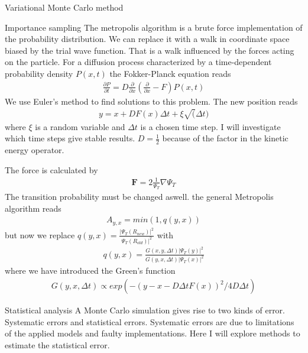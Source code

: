 \documentclass[a4paper, 12pt, titlepage]{article}
\begin{document}
\begin{section}{Variational Monte Carlo method}
 \begin{subsection}{Importance sampling}
 	The metropolis algorithm is a brute force implementation of the probability distribution. We can replace it with a walk in coordinate space biased by the trial wave function. That is a walk influenced by the forces acting on the particle. 
 	For a diffusion process characterized by a time-dependent probability density $P(x,t)$ the Fokker-Planck equation reads
 	\begin{align}
 		\frac{\partial P}{\partial t} = D \frac{\partial }{\partial x} \left( \frac{\partial}{\partial x} - F \right) P(x,t)
 	\end{align}
 	We use Euler's method to find solutions to this problem. The new position reads
 	\begin{align}
 		y = x + DF(x) \Delta t + \xi \sqrt(\Delta t)
 	\end{align}
 	where $\xi$ is a random variable and $\Delta t$ is a chosen time step. I will investigate which time steps give stable results. $D = \frac{1}{2}$ because of the factor in the kinetic energy operator. \par
 	The force is calculated by
 	\begin{align}
 		\mathbf{F} = 2 \frac{1}{\Psi_T}\nabla \Psi_T 
 	\end{align}
 	The transition probability must be changed aswell. the general Metropolis algorithm reads
 	\begin{align}
 		A_{y,x} = min \left(1, q(y,x) \right)
 	\end{align}
 	but now we replace $q(y,x) = \frac{|\Psi_T(R_{new})|^2}{\Psi_T(R_{old})|^2}$ with
 	\begin{align}
 		q(y,x) = \frac{G(x,y,\Delta t)|\Psi_T(y)|^2}{G(y,x,\Delta t)|\Psi_T(x)|^2}
 	\end{align}
 	where we have introduced the Green's function
 	\begin{align}
 		G(y,x,\Delta t) \propto exp(-(y-x-D\Delta t F(x))^2 / 4D\Delta t)
 	\end{align}
 \end{subsection}

 \begin{subsection}{Statistical analysis}
 	A Monte Carlo simulation gives rise to two kinds of error. Systematic errors and statistical errors. Systematic errors are due to limitations of the applied models and faulty implementations. Here I will explore methods to estimate the statistical error. 


\end{subsection}
\end{section}
\end{document}
